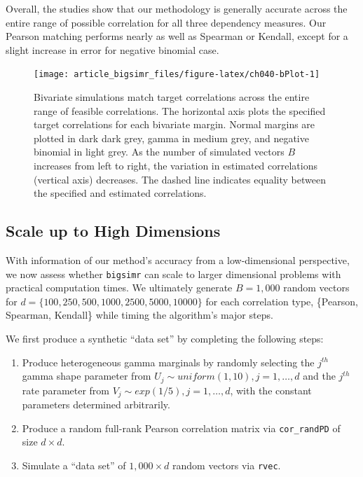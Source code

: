 \documentclass[
]{jss}
\providecommand{\tightlist}{%
  \setlength{\itemsep}{0pt}\setlength{\parskip}{0pt}}
\begin{document}
Overall, the studies show that our methodology is generally accurate
across the entire range of possible correlation for all three dependency
measures. Our Pearson matching performs nearly as well as Spearman or
Kendall, except for a slight increase in error for negative binomial
case.

\begin{CodeChunk}
\begin{figure}

{\centering \texttt{[image: article\_bigsimr\_files/figure-latex/ch040-bPlot-1]} 

}

\caption[Bivariate simulations match target correlations across the entire range of feasible correlations]{Bivariate simulations match target correlations across the entire range of feasible correlations. The horizontal axis plots the specified target correlations for each bivariate margin. Normal margins are plotted in dark dark grey, gamma in medium grey, and negative binomial in light grey. As the number of simulated vectors $B$ increases from left to right, the variation in estimated correlations (vertical axis) decreases. The dashed line indicates equality between the specified and estimated correlations.}\label{fig:ch040-bPlot}
\end{figure}
\end{CodeChunk}

\hypertarget{scale-up-to-high-dimensions}{%
\subsection{Scale up to High
Dimensions}\label{scale-up-to-high-dimensions}}

With information of our method's accuracy from a low-dimensional
perspective, we now assess whether \texttt{bigsimr} can scale to larger
dimensional problems with practical computation times. We ultimately
generate \(B=1,000\) random vectors for
\(d=\{100, 250, 500, 1000, 2500, 5000, 10000\}\) for each correlation
type, \{Pearson, Spearman, Kendall\} while timing the algorithm's major
steps.

We first produce a synthetic ``data set'' by completing the following
steps:


\begin{enumerate}
\def\labelenumi{\arabic{enumi}.}
\tightlist
\item
  Produce heterogeneous gamma marginals by randomly selecting the
  \(j^{th}\) gamma shape parameter from
  \(U_j \sim uniform(1,10), j=1,\ldots,d\) and the \(j^{th}\) rate
  parameter from \(V_j \sim exp(1/5), j=1,\ldots,d\), with the constant
  parameters determined arbitrarily.
\item
  Produce a random full-rank Pearson correlation matrix via
  \texttt{cor\_randPD} of size \(d \times d\).
\item
  Simulate a ``data set'' of \(1,000 \times d\) random vectors via
  \texttt{rvec}. 
\end{enumerate}
\end{document}
